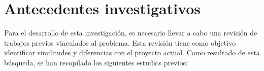 \section{Antecedentes investigativos}


% 



Para el desarrollo de esta investigación, es necesario llevar a cabo una revisión de trabajos previos vinculados al problema. Esta revisión tiene como objetivo identificar similitudes y diferencias con el proyecto actual. Como resultado de esta búsqueda, se han recopilado los siguientes estudios previos:

